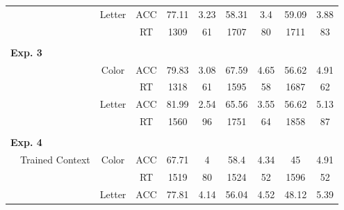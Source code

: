 \documentclass[]{DissertateCUNY}
\begin{document}
\begin{table}[htbp]
\begin{tabular}{cccccccccc}
& & \multicolumn{1}{c}{Letter} & \multicolumn{1}{c}{ACC} & \multicolumn{1}{c}{77.11} & \multicolumn{1}{c}{3.23} & \multicolumn{1}{c}{58.31} & \multicolumn{1}{c}{3.4} & \multicolumn{1}{c}{59.09} & \multicolumn{1}{c}{3.88} \\
& & & \multicolumn{1}{c}{RT} & \multicolumn{1}{c}{1309} & \multicolumn{1}{c}{61} & \multicolumn{1}{c}{1707} & \multicolumn{1}{c}{80} & \multicolumn{1}{c}{1711} & \multicolumn{1}{c}{83} \\
\cmidrule(l){2-10}
& & & & & & & & & \\
\multicolumn{2}{l}{\textbf{Exp. 3}}  &   &    &     &     &    &  & & \\
& & \multicolumn{1}{c}{Color} & \multicolumn{1}{c}{ACC} & \multicolumn{1}{c}{79.83} & \multicolumn{1}{c}{3.08} & \multicolumn{1}{c}{67.59} & \multicolumn{1}{c}{4.65} & \multicolumn{1}{c}{56.62} & \multicolumn{1}{c}{4.91} \\
& & & \multicolumn{1}{c}{RT} & \multicolumn{1}{c}{1318} & \multicolumn{1}{c}{61} & \multicolumn{1}{c}{1595} & \multicolumn{1}{c}{58} & \multicolumn{1}{c}{1687} & \multicolumn{1}{c}{62} \\
& & \multicolumn{1}{c}{Letter} & \multicolumn{1}{c}{ACC} & \multicolumn{1}{c}{81.99} & \multicolumn{1}{c}{2.54} & \multicolumn{1}{c}{65.56} & \multicolumn{1}{c}{3.55} & \multicolumn{1}{c}{56.62} & \multicolumn{1}{c}{5.13} \\
& & & \multicolumn{1}{c}{RT} & \multicolumn{1}{c}{1560} & \multicolumn{1}{c}{96} & \multicolumn{1}{c}{1751} & \multicolumn{1}{c}{64} & \multicolumn{1}{c}{1858} & \multicolumn{1}{c}{87} \\
\cmidrule(l){2-10}
 & & & & & & & & & \\
\multicolumn{2}{l}{\textbf{Exp. 4}}  &   &    &     &     &    &  & & \\
& \multicolumn{1}{l}{Trained Context} & \multicolumn{1}{c}{Color} & \multicolumn{1}{c}{ACC} & \multicolumn{1}{c}{67.71} & \multicolumn{1}{c}{4} & \multicolumn{1}{c}{58.4} & \multicolumn{1}{c}{4.34} & \multicolumn{1}{c}{45} & \multicolumn{1}{c}{4.91} \\
& & & \multicolumn{1}{c}{RT} & \multicolumn{1}{c}{1519} & \multicolumn{1}{c}{80} & \multicolumn{1}{c}{1524} & \multicolumn{1}{c}{52} & \multicolumn{1}{c}{1596} & \multicolumn{1}{c}{52} \\
& & \multicolumn{1}{c}{Letter} & \multicolumn{1}{c}{ACC} & \multicolumn{1}{c}{77.81} & \multicolumn{1}{c}{4.14} & \multicolumn{1}{c}{56.04} & \multicolumn{1}{c}{4.52} & \multicolumn{1}{c}{48.12} & \multicolumn{1}{c}{5.39} \\

\end{tabular}
\end{table}
\end{document}

